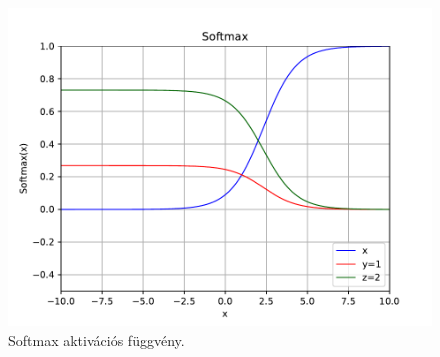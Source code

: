 \begin{itemize}
\begin{figure} [h!]
\begin{minipage}[c]{0.33\linewidth}
			\centering
			\includegraphics[width=\textwidth]{img/Softmax.pdf}
					\captionsetup{justification=centering}
			\caption{Softmax aktivációs függvény.}
			\label{fig:softmax}
			
			
		\end{minipage}
	\end{figure}
\end{itemize}
%
%
%
%
%
%
%
%	
%		
%		
%
% 
%
%
%	
%		


